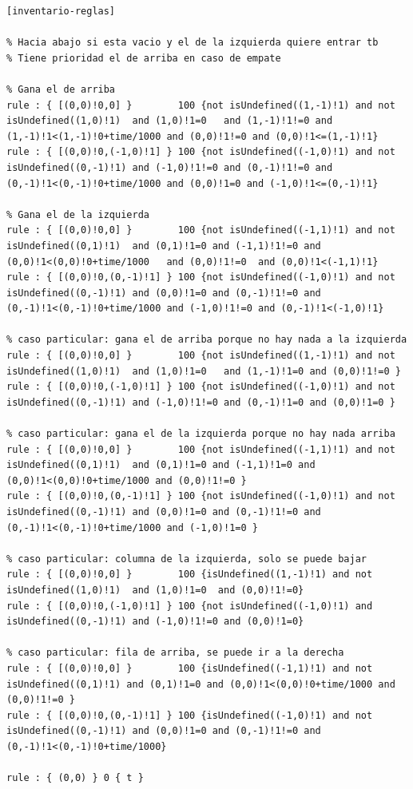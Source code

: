 \documentclass[10pt]{article}
\begin{document}
\begin{minipage}{1\textwidth}
	\centering
	\begin{lstlisting}
[inventario-reglas]

% Hacia abajo si esta vacio y el de la izquierda quiere entrar tb
% Tiene prioridad el de arriba en caso de empate

% Gana el de arriba
rule : { [(0,0)!0,0] }        100 {not isUndefined((1,-1)!1) and not isUndefined((1,0)!1)  and (1,0)!1=0   and (1,-1)!1!=0 and (1,-1)!1<(1,-1)!0+time/1000 and (0,0)!1!=0 and (0,0)!1<=(1,-1)!1}
rule : { [(0,0)!0,(-1,0)!1] } 100 {not isUndefined((-1,0)!1) and not isUndefined((0,-1)!1) and (-1,0)!1!=0 and (0,-1)!1!=0 and (0,-1)!1<(0,-1)!0+time/1000 and (0,0)!1=0 and (-1,0)!1<=(0,-1)!1}

% Gana el de la izquierda
rule : { [(0,0)!0,0] }        100 {not isUndefined((-1,1)!1) and not isUndefined((0,1)!1)  and (0,1)!1=0 and (-1,1)!1!=0 and (0,0)!1<(0,0)!0+time/1000   and (0,0)!1!=0  and (0,0)!1<(-1,1)!1}
rule : { [(0,0)!0,(0,-1)!1] } 100 {not isUndefined((-1,0)!1) and not isUndefined((0,-1)!1) and (0,0)!1=0 and (0,-1)!1!=0 and (0,-1)!1<(0,-1)!0+time/1000 and (-1,0)!1!=0 and (0,-1)!1<(-1,0)!1}

% caso particular: gana el de arriba porque no hay nada a la izquierda
rule : { [(0,0)!0,0] }        100 {not isUndefined((1,-1)!1) and not isUndefined((1,0)!1)  and (1,0)!1=0   and (1,-1)!1=0 and (0,0)!1!=0 }
rule : { [(0,0)!0,(-1,0)!1] } 100 {not isUndefined((-1,0)!1) and not isUndefined((0,-1)!1) and (-1,0)!1!=0 and (0,-1)!1=0 and (0,0)!1=0 }

% caso particular: gana el de la izquierda porque no hay nada arriba
rule : { [(0,0)!0,0] }        100 {not isUndefined((-1,1)!1) and not isUndefined((0,1)!1)  and (0,1)!1=0 and (-1,1)!1=0 and (0,0)!1<(0,0)!0+time/1000 and (0,0)!1!=0 }
rule : { [(0,0)!0,(0,-1)!1] } 100 {not isUndefined((-1,0)!1) and not isUndefined((0,-1)!1) and (0,0)!1=0 and (0,-1)!1!=0 and (0,-1)!1<(0,-1)!0+time/1000 and (-1,0)!1=0 }

% caso particular: columna de la izquierda, solo se puede bajar
rule : { [(0,0)!0,0] }        100 {isUndefined((1,-1)!1) and not isUndefined((1,0)!1)  and (1,0)!1=0  and (0,0)!1!=0}
rule : { [(0,0)!0,(-1,0)!1] } 100 {not isUndefined((-1,0)!1) and isUndefined((0,-1)!1) and (-1,0)!1!=0 and (0,0)!1=0}

% caso particular: fila de arriba, se puede ir a la derecha
rule : { [(0,0)!0,0] }        100 {isUndefined((-1,1)!1) and not isUndefined((0,1)!1) and (0,1)!1=0 and (0,0)!1<(0,0)!0+time/1000 and (0,0)!1!=0 }
rule : { [(0,0)!0,(0,-1)!1] } 100 {isUndefined((-1,0)!1) and not isUndefined((0,-1)!1) and (0,0)!1=0 and (0,-1)!1!=0 and (0,-1)!1<(0,-1)!0+time/1000}

rule : { (0,0) } 0 { t }

	\end{lstlisting}
\end{minipage}
\end{document}
